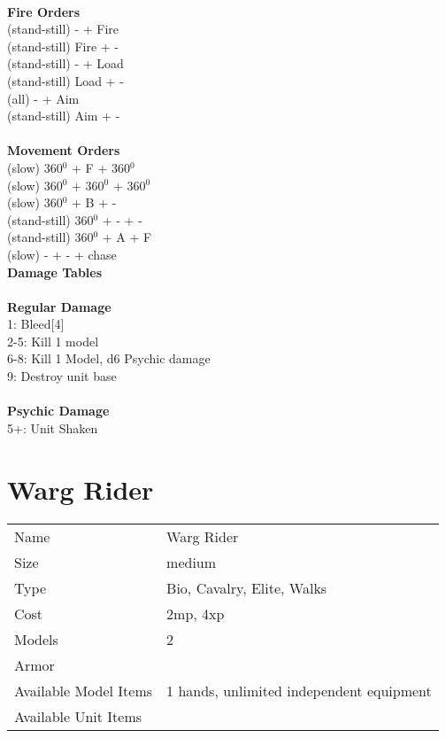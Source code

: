 \ \\ {\bf Fire Orders } \\
(stand-still) - + Fire \\
(stand-still) Fire + -  \\
(stand-still) - + Load \\
(stand-still) Load + - \\
(all) - + Aim \\
(stand-still) Aim + -  \\
\ \\ {\bf Movement Orders } \\
(slow) 360$^0$ + F + 360$^0$ \\
(slow) 360$^0$ + 360$^0$ + 360$^0$ \\
(slow) 360$^0$ + B + - \\
(stand-still) 360$^0$ + - + - \\
(stand-still) 360$^0$ + A + F \\
(slow) - + - + chase \\



{\bf Damage Tables} \\
\ \\ {\bf Regular Damage } \\
1: Bleed[4] \\
2-5: Kill 1 model \\
6-8: Kill 1 Model, d6 Psychic damage \\
9: Destroy unit base \\
\ \\ {\bf Psychic Damage } \\
5+: Unit Shaken \\









\pagebreak

\section{ Warg Rider }

\begin{tabular}{ll}
  Name & Warg Rider \\
  Size & medium\\
  Type & Bio, Cavalry, Elite, Walks\\
  Cost & 2mp, 4xp\\
  Models & 2\\
  Armor & \\
  Available Model Items & 1 hands, unlimited independent equipment \\
  Available Unit Items &  \\
\end{tabular}

